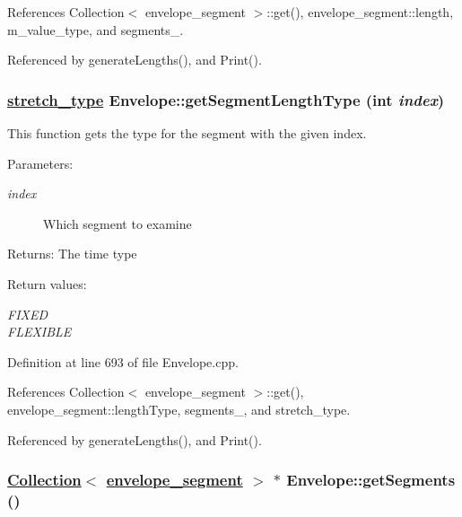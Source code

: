 References Collection$<$ envelope\_\-segment $>$::get(), envelope\_\-segment::length, m\_\-value\_\-type, and segments\_\-.

Referenced by generate\-Lengths(), and Print().\hypertarget{classEnvelope_a22}{
\subsubsection[getSegmentLengthType]{\setlength{\rightskip}{0pt plus 5cm}\hyperlink{Types_8h_a12}{stretch\_\-type} Envelope::get\-Segment\-Length\-Type (int {\em index})}}
\label{classEnvelope_a22}


This function gets the type for the segment with the given index. \begin{Desc}
\item[Parameters:]
\begin{description}
\item[{\em index}]Which segment to examine \end{description}
\end{Desc}
\begin{Desc}
\item[Returns:]The time type \end{Desc}
\begin{Desc}
\item[Return values:]
\begin{description}
\item[{\em FIXED}]\item[{\em FLEXIBLE}]\end{description}
\end{Desc}


Definition at line 693 of file Envelope.cpp.

References Collection$<$ envelope\_\-segment $>$::get(), envelope\_\-segment::length\-Type, segments\_\-, and stretch\_\-type.

Referenced by generate\-Lengths(), and Print().\hypertarget{classEnvelope_a13}{
\subsubsection[getSegments]{\setlength{\rightskip}{0pt plus 5cm}\hyperlink{classCollection}{Collection}$<$ \hyperlink{structenvelope__segment}{envelope\_\-segment} $>$ $\ast$ Envelope::get\-Segments ()}}
\label{classEnvelope_a13}


